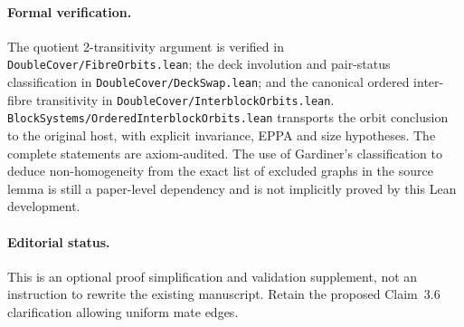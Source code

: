 \documentclass[11pt,a4paper]{article}
\begin{document}
\paragraph{Formal verification.}
The quotient 2-transitivity argument is
verified in \texttt{DoubleCover/FibreOrbits.lean};
the deck involution and pair-status
classification in \texttt{DoubleCover/DeckSwap.lean};
and the canonical ordered inter-fibre
transitivity in \texttt{DoubleCover/InterblockOrbits.lean}.
\texttt{BlockSystems/OrderedInterblockOrbits.lean}
transports the orbit conclusion to the
original host, with explicit invariance,
EPPA and size hypotheses.
The complete statements are axiom-audited.
The use of Gardiner's classification to
deduce non-homogeneity from the exact list
of excluded graphs in the source lemma is
still a paper-level dependency and is not
implicitly proved by this Lean development.

\paragraph{Editorial status.}
This is an optional proof simplification
and validation supplement, not an instruction
to rewrite the existing manuscript.
Retain the proposed Claim~3.6 clarification
allowing uniform mate edges.
\end{document}
